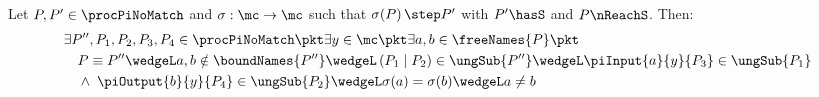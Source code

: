 \documentclass[]{article}
\begin{document}
\begin{lemma}
	\label{lem:newCom}
	Let $ P, P' \in \procPiNoMatch $ and $ \sigma : \mc \to \mc $ such that $ \sigma\!\left( P \right) \step P' $ with $ P' \hasS $ and $ P \nReachS $. Then:
	\begin{align*}
		& \exists P'', P_1, P_2, P_3, P_4 \in \procPiNoMatch \pkt \exists y \in \mc \pkt \exists a, b \in \freeNames{P} \pkt\\
		& \hspace{1em} P \equiv P'' \wedgeL a, b \notin \boundNames{P''} \wedgeL \left( P_1 \mid P_2 \right) \in \ungSub{P''} \wedgeL \piInput{a}{y}{P_3} \in \ungSub{P_1}\\
		& \hspace{1em} \wedge \; \piOutput{b}{y}{P_4} \in \ungSub{P_2} \wedgeL \sigma(a) = \sigma(b) \wedgeL a \neq b
	\end{align*}
\end{lemma}
\end{document}
